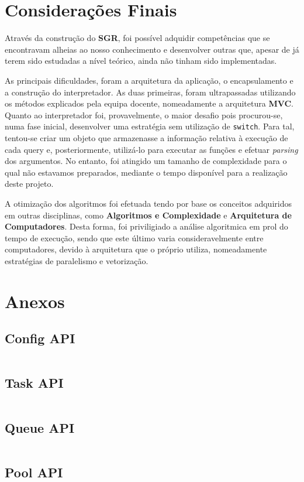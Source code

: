 \documentclass{article}
\begin{document}
\section{Considerações Finais}

Através da construção do \textbf{SGR}, foi possível adquidir competências que se encontravam alheias ao nosso conhecimento e desenvolver outras que, apesar de já terem sido estudadas a nível teórico, ainda não tinham sido implementadas.

As principais dificuldades, foram a arquitetura da aplicação, o encapsulamento e a construção do interpretador. As duas primeiras, foram ultrapassadas utilizando os métodos explicados pela equipa docente, nomeadamente a arquitetura \textbf{MVC}. Quanto ao interpretador foi, provavelmente, o maior desafio pois procurou-se, numa fase inicial, desenvolver uma estratégia sem utilização de \texttt{switch}. Para tal, tentou-se criar um objeto que armazenasse a informação relativa à execução de cada query e, posteriormente, utilizá-lo para executar as funções e efetuar \textit{parsing} dos argumentos. No entanto, foi atingido um tamanho de complexidade para o qual não estavamos preparados, mediante o tempo disponível para a realização deste projeto.

A otimização dos algoritmos foi efetuada tendo por base os conceitos adquiridos em outras disciplinas, como \textbf{Algoritmos e Complexidade} e \textbf{Arquitetura de Computadores}. Desta forma, foi priviligiado a análise algoritmica em prol do tempo de execução, sendo que este último varia consideravelmente entre computadores, devido à arquitetura que o próprio utiliza, nomeadamente estratégias de paralelismo e vetorização.

\section{Anexos}

\subsection{Config API} \label{config_api}

\inputminted{C}{../include/modules/config.h}

\subsection{Task API} \label{task_api}

\inputminted{C}{../include/modules/task.h}

\subsection{Queue API} \label{queue_api}

\inputminted{C}{../include/modules/queue.h}

\subsection{Pool API} \label{pool_api}

\inputminted{C}{../include/modules/pool.h}
\end{document}
